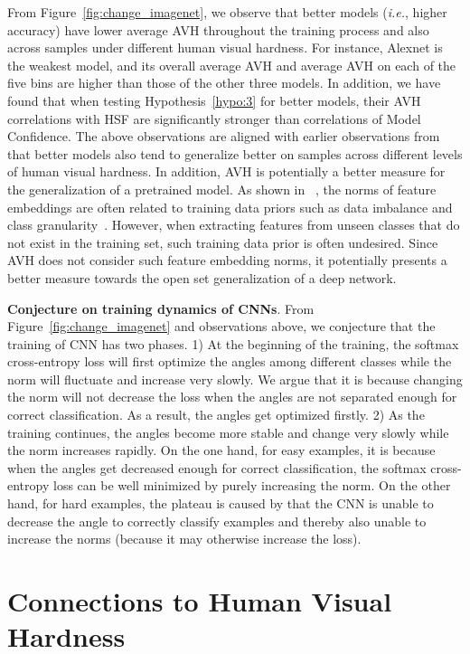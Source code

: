 From Figure~\ref{fig:change_imagenet}, we observe that better models (\emph{i.e.}, higher accuracy) have lower average AVH throughout the training process and also across samples under different human visual hardness. For instance, Alexnet is the weakest model, and its overall average AVH and average AVH on each of the five bins are higher than those of the other three models. In addition, we have found that when testing Hypothesis~\ref{hypo:3} for better models, their AVH correlations with HSF are significantly stronger than correlations of Model Confidence. The above observations are aligned with earlier observations from \cite{recht2019imagenet} that better models also tend to generalize better on samples across different levels of human visual hardness. In addition, AVH is potentially a better measure for the generalization of a pretrained model. As shown in ~\cite{sphereface}, the norms of feature embeddings are often related to training data priors such as data imbalance and class granularity~\cite{krizhevsky2012imagenet}. However, when extracting features from unseen classes that do not exist in the training set, such training data prior is often undesired. Since AVH does not consider such feature embedding norms, it potentially presents a better measure towards the open set generalization of a deep network.

\textbf{Conjecture on training dynamics of CNNs}. From Figure~\ref{fig:change_imagenet} and observations above, we conjecture that the training of CNN has two phases. 1) At the beginning of the training, the softmax cross-entropy loss will first optimize the angles among different classes while the norm will fluctuate and increase very slowly. We argue that it is because changing the norm will not decrease the loss when the angles are not separated enough for correct classification. As a result, the angles get optimized firstly. 2) As the training continues, the angles become more stable and change very slowly while the norm increases rapidly. On the one hand, for easy examples, it is because when the angles get decreased enough for correct classification, the softmax cross-entropy loss can be well minimized by purely increasing the norm. On the other hand, for hard examples, the plateau is caused by that the CNN is unable to decrease the angle to correctly classify examples and thereby also unable to increase the norms (because it may otherwise increase the loss).

\section{Connections to Human Visual Hardness}
\label{sec:correlation}

